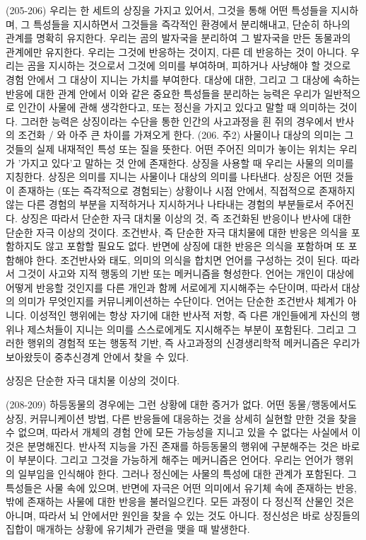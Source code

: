 \documentclass[11pt, a4paper]{article}
\begin{document}
(205-206) 우리는 한 세트의 상징을 가지고 있어서, 그것을 통해 어떤 특성들을 지시하며, 그 특성들을 지시하면서 그것들을 즉각적인 환경에서 분리해내고, 단순히 하나의 관계를 명확히 유지한다. 우리는 곰의 발자국을 분리하여 그 발자국을 만든 동물과의 관계에만 유지한다. 우리는 그것에 반응하는 것이지, 다른 데 반응하는 것이 아니다. 우리는 곰을 지시하는 것으로서 그것에 의미를 부여하며, 피하거나 사냥해야 할 것으로 경험 안에서 그 대상이 지니는 가치를 부여한다. 대상에 대한, 그리고 그 대상에 속하는 반응에 대한 관계 안에서 이와 같은 중요한 특성들을 분리하는 능력은 우리가 일반적으로 인간이 사물에 관해 생각한다고, 또는 정신을 가지고 있다고 말할 때 의미하는 것이다. 그러한 능력은 상징이라는 수단을 통한 인간의 사고과정을 흰 쥐의 경우에서 반사의 조건화 / 와 아주 큰 차이를 가져오게 한다.
(206. 주2) 사물이나 대상의 의미는 그것들의 실제 내재적인 특성 또는 질을 뜻한다. 어떤 주어진 의미가 놓이는 위치는 우리가 '가지고 있다'고 말하는 것 안에 존재한다. 상징을 사용할 때 우리는 사물의 의미를 지칭한다. 상징은 의미를 지니는 사물이나 대상의 의미를 나타낸다. 상징은 어떤 것들이 존재하는 (또는 즉각적으로 경험되는) 상황이나 시점 안에서, 직접적으로 존재하지 않는 다른 경험의 부분을 지적하거나 지시하거나 나타내는 경험의 부분들로서 주어진다. 상징은 따라서 단순한 자극 대치물 이상의 것, 즉 조건화된 반응이나 반사에 대한 단순한 자극 이상의 것이다. 조건반사, 즉 단순한 자극 대치물에 대한 반응은 의식을 포함하지도 않고 포함할 필요도 없다. 반면에 상징에 대한 반응은 의식을 포함하며 또 포함해야 한다. 조건반사와 태도, 의미의 의식을 합치면 언어를 구성하는 것이 된다. 따라서 그것이 사고와 지적 행동의 기반 또는 메커니즘을 형성한다. 언어는 개인이 대상에 어떻게 반응할 것인지를 다른 개인과 함께 서로에게 지시해주는 수단이며, 따라서 대상의 의미가 무엇인지를 커뮤니케이션하는 수단이다. 언어는 단순한 조건반사 체계가 아니다. 이성적인 행위에는 항상 자기에 대한 반사적 저항, 즉 다른 개인들에게 자신의 행위나 제스처들이 지니는 의미를 스스로에게도 지시해주는 부분이 포함된다. 그리고 그러한 행위의 경험적 또는 행동적 기반, 즉 사고과정의 신경생리학적 메커니즘은 우리가 보아왔듯이 중추신경계 안에서 찾을 수 있다.

상징은 단순한 자극 대치물 이상의 것이다.

(208-209) 하등동물의 경우에는 그런 상황에 대한 증거가 없다. 어떤 동물/행동에서도 상징, 커뮤니케이션 방법, 다른 반응들에 대응하는 것을 상세히 실현할 만한 것을 찾을 수 없으며, 따라서 개체의 경험 안에 모든 가능성을 지니고 있을 수 없다는 사실에서 이것은 분명해진다. 반사적 지능을 가진 존재를 하등동물의 행위에 구분해주는 것은 바로 이 부분이다. 그리고 그것을 가능하게 해주는 메커니즘은 언어다. 우리는 언어가 행위의 일부임을 인식해야 한다. 그러나 정신에는 사물의 특성에 대한 관계가 포함된다. 그 특성들은 사물 속에 있으며, 반면에 자극은 어떤 의미에서 유기체 속에 존재하는 반응, 밖에 존재하는 사물에 대한 반응을 불러일으킨다. 모든 과정이 다 정신적 산물인 것은 아니며, 따라서 뇌 안에서만 원인을 찾을 수 있는 것도 아니다. 정신성은 바로 상징들의 집합이 매개하는 상황에 유기체가 관련을 맺을 때 발생한다.
\end{document}
